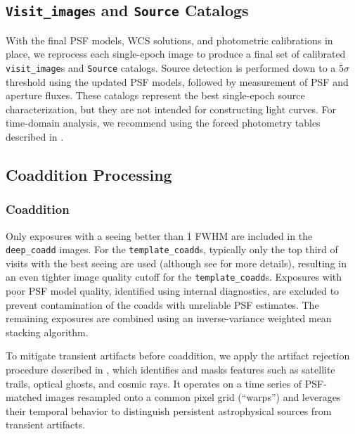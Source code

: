 \subsection{\texttt{Visit\_image}s and \texttt{Source} Catalogs}
\label{sssec:visit_images_source_catalogs}
With the final \gls{PSF} models, \gls{WCS} solutions, and photometric calibrations in place, we reprocess each single-epoch image to produce a final set of calibrated \texttt{visit\_image}s and \texttt{Source} catalogs.
Source detection is performed down to a $5\sigma$ threshold using the updated \gls{PSF} models, followed by measurement of \gls{PSF} and aperture fluxes.
These catalogs represent the best single-\gls{epoch} source characterization, but they are not intended for constructing light curves.
For time-domain analysis, we recommend using the \gls{forced photometry} tables described in .

\subsection{Coaddition Processing}
\label{ssec:coadd_processing}
\subsubsection{Coaddition}
\label{ssec:coaddition}
Only exposures with a \gls{seeing} better than 1 FWHM are included in the \texttt{deep\_coadd} images.
For the \texttt{template\_coadd}s, typically only the top third of visits with the best \gls{seeing} are used (although see  for more details), resulting in an even tighter image quality cutoff for the \texttt{template\_coadd}s.
Exposures with poor \gls{PSF} model quality, identified using internal diagnostics, are excluded to prevent contamination of the coadds with unreliable \gls{PSF} estimates. The remaining exposures are combined using an inverse-variance weighted mean stacking \gls{algorithm}.

To mitigate transient artifacts before coaddition, we apply the artifact rejection procedure described in \cite{DMTN-080}, which identifies and masks features such as satellite trails, optical ghosts, and cosmic rays.
It operates on a time series of \gls{PSF}-matched images resampled onto a common pixel grid (``warps'') and leverages their temporal behavior to distinguish persistent astrophysical sources from transient artifacts.


